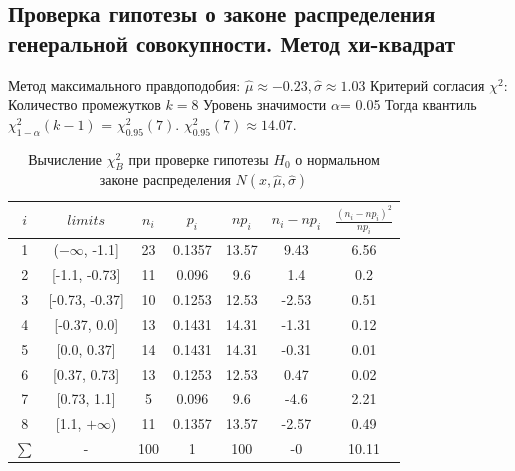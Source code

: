\documentclass[main.tex]{subfiles}
\begin{document}
\FloatBarrier
\subsection{Проверка гипотезы о законе распределения генеральной совокупности. Метод хи-квадрат}

\noindent Метод максимального правдоподобия:
\newline
$\hat{\mu} \approx -0.23, \hat{\sigma} \approx 1.03$
\newline
Критерий согласия $\chi^{2}$:
\newline
Количество промежутков $k = 8$
\newline
Уровень значимости $\alpha$= 0.05
\newline
Тогда квантиль $\chi^{2}_{1-\alpha}(k-1)$ = $\chi^{2}_{0.95}(7)$. $\chi^{2}_{0.95}(7) \approx 14.07$. 
\begin{table}[ht]
	\centering
	\begin{tabular}{| c | c | c | c | c | c | c |}
		\hline
		$i$ & $limits$         &   $n_i$ &    $p_i$ &   $np_i$ &   $n_i - np_i$ &   $\frac{(n_i-np_i)^2}{np_i}$ \\
		\hline
		1 & ($-\infty$, -1.1] &    23 & 0.1357 &  13.57 &         9.43 &                        6.56 \\
		2 & [-1.1, -0.73]  &    11 & 0.096  &   9.6  &         1.4  &                        0.2  \\
		3 & [-0.73, -0.37] &    10 & 0.1253 &  12.53 &        -2.53 &                        0.51 \\
		4 & [-0.37, 0.0]   &    13 & 0.1431 &  14.31 &        -1.31 &                        0.12 \\
		5 & [0.0, 0.37]    &    14 & 0.1431 &  14.31 &        -0.31 &                        0.01 \\
		6 & [0.37, 0.73]   &    13 & 0.1253 &  12.53 &         0.47 &                        0.02 \\
		7 & [0.73, 1.1]    &     5 & 0.096  &   9.6  &        -4.6  &                        2.21 \\
		8 & [1.1, $+\infty$)   &    11 & 0.1357 &  13.57 &        -2.57 &                        0.49 \\
		$\sum$ & -              &   100 & 1      & 100    &        -0    &                       10.11 \\
		\hline
	\end{tabular}
	\caption{ Вычисление $\chi^{2}_{B}$ при проверке гипотезы $H_{0}$ о нормальном законе распределения $N(x,\hat{\mu}, \hat{\sigma})$}
	\label{tab:normal_chi_2}
\end{table} 
\end{document}
